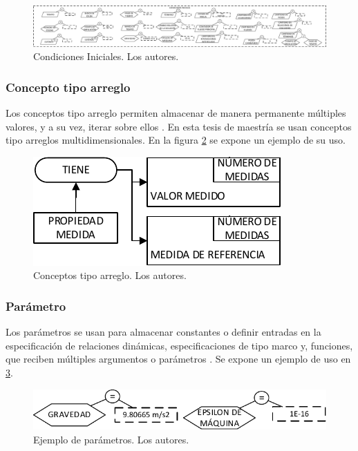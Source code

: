\begin{figure}[h]
	\centering%
	\includegraphics[width=0.9\linewidth]{Fig/EjInitialConditions.pdf}%
	\caption[Condiciones Iniciales.]{Condiciones Iniciales. Los autores.} \label{fig:EjInitialConditions}
\end{figure}

\subsubsection{Concepto tipo arreglo}
Los conceptos tipo arreglo permiten almacenar de manera permanente múltiples valores, y a su vez, iterar sobre ellos \citep{JCalle}. En esta tesis de maestría se usan conceptos tipo arreglos multidimensionales. En la figura \ref{fig:EjArrConcept} se expone un ejemplo de su uso.

\begin{figure}[h]
	\centering%
	\includegraphics[scale=1]{Fig/EjArrConcepts.pdf}%
	\caption[Conceptos tipo arreglo.]{Conceptos tipo arreglo. Los autores.} \label{fig:EjArrConcept}
\end{figure}

\subsubsection{Parámetro}
Los parámetros se usan para almacenar constantes o definir entradas en la especificación de relaciones dinámicas, especificaciones de tipo marco y, funciones, que reciben múltiples argumentos o parámetros \citep{JCalle, norena2018det}. Se expone un ejemplo de uso en \ref{fig:EjParameter}.\\

\begin{figure}[h]
	\centering%
	\includegraphics[width=0.5\linewidth]{Fig/EjParametro.pdf}%
	\caption[Ejemplo de parámetros.]{Ejemplo de parámetros. Los autores.} \label{fig:EjParameter}
\end{figure}

